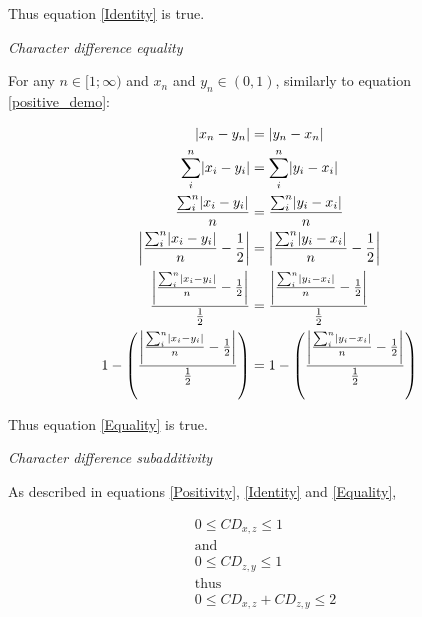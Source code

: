 \documentclass[12pt,letterpaper]{article}
\DeclarePairedDelimiter\abs{\lvert}{\rvert}%
\renewcommand{\subsection}[1]{%
\bigskip
\begin{center}
\begin{large}
\normalfont\itshape #1
\end{large}
\end{center}}
\begin{document}
Thus equation \ref{Identity} is true.

\subsection{Character difference equality}

For any $n \in [1;\infty)$ and $x_{n}$ and $y_{n} \in (0,1)$, similarly to equation \ref{positive_demo}:

\begin{equation}
    \label{equality_demo}
    \begin{aligned}
    \abs{x_{n}-y_{n}} &= \abs{y_{n}-x_{n}}\\
    \sum_{i}^{n}\abs{x_{i}-y_{i}} &= \sum_{i}^{n}\abs{y_{i}-x_{i}}\\
    \frac{\sum_{i}^{n}\abs{x_{i}-y_{i}}}{n} &= \frac{\sum_{i}^{n}\abs{y_{i}-x_{i}}}{n}\\
    \abs*{\frac{\sum_{i}^{n}\abs{x_{i}-y_{i}}}{n}-\frac{1}{2}} &= \abs*{\frac{\sum_{i}^{n}\abs{y_{i}-x_{i}}}{n}-\frac{1}{2}}\\
    \frac{\abs*{\frac{\sum_{i}^{n}\abs{x_{i}-y_{i}}}{n}-\frac{1}{2}}}{\frac{1}{2}} &= \frac{\abs*{\frac{\sum_{i}^{n}\abs{y_{i}-x_{i}}}{n}-\frac{1}{2}}}{\frac{1}{2}}\\
    1 - \left(\frac{\abs*{\frac{\sum_{i}^{n}\abs{x_{i}-y_{i}}}{n}-\frac{1}{2}}}{\frac{1}{2}}\right) &= 1 - \left(\frac{\abs*{\frac{\sum_{i}^{n}\abs{y_{i}-x_{i}}}{n}-\frac{1}{2}}}{\frac{1}{2}}\right)\\
    \end{aligned}
\end{equation}

Thus equation \ref{Equality} is true.

\subsection{Character difference subadditivity}

As described in equations \ref{Positivity}, \ref{Identity} and \ref{Equality}, 

\begin{equation}
    \label{subadditivity_demo}
    \begin{aligned}
    &0\leq CD_{x,z} \leq 1\\
    &\text{and}\\
    &0\leq CD_{z,y} \leq 1\\
    &\text{thus}\\
    &0\leq CD_{x,z} + CD_{z,y}  \leq 2\\
    \end{aligned}
\end{equation}
\end{document}
